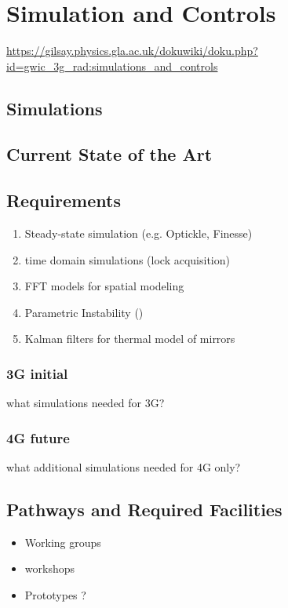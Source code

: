 \section{Simulation and Controls}
\label{sec:SimControls}

\url{https://gilsay.physics.gla.ac.uk/dokuwiki/doku.php?id=gwic_3g_rad:simulations_and_controls}
\subsection{Simulations}
\subsection{Current State of the Art}

\subsection{Requirements}
\begin{enumerate}
\item Steady-state simulation (e.g. Optickle, Finesse)
\item time domain simulations (lock acquisition)
\item FFT models for spatial modeling
\item Parametric Instability ()
\item Kalman filters for thermal model of mirrors
\end{enumerate}
\subsubsection{3G initial}
what simulations needed for 3G?

\subsubsection{4G future}
what additional simulations needed for 4G only?

\subsection{Pathways and Required Facilities}
\begin{itemize}
\item Working groups
\item workshops
\item Prototypes ?
\end{itemize}


